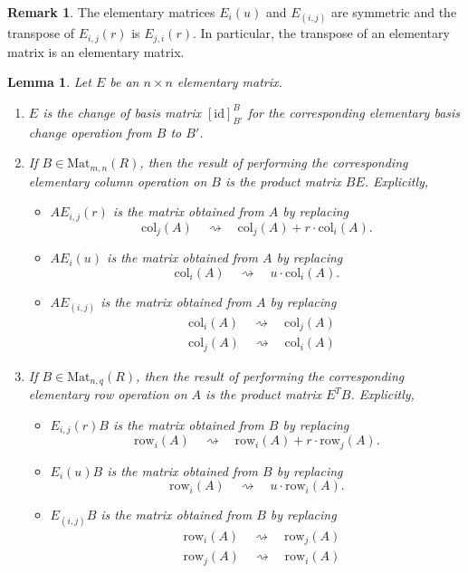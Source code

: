 \documentclass[12pt]{report}
\newtheorem{lemma}[theorem]{Lemma}
\numberwithin{equation}{section}
\numberwithin{theorem}{chapter}
\theoremstyle{definition}
\newtheorem*{basic properties}{Basic Properties}
\newtheorem*{Important Remark}{Important Remark}
\newtheorem{remark}[theorem]{Remark}
\begin{document}
	\begin{remark}
	The elementary matrices $E_i(u)$ and $E_{(i,j)}$ are symmetric and the transpose of $E_{i,j}(r)$ is $E_{j,i}(r)$. In particular, the transpose of an elementary matrix is an elementary matrix.
	\end{remark}


\begin{lemma}
Let $E$ be an $n \times n$ elementary matrix.
\begin{enumerate}
\item $E$ is the change of basis matrix $[\mathrm{id}]_{B'}^B$ for the corresponding elementary basis change operation from $B$ to $B'$.
\item If $B \in \mathrm{Mat}_{m,n}(R)$, then the result of performing the corresponding elementary column operation on $B$ is the product matrix $BE$.
Explicitly,

\begin{itemize}
\item $AE_{i,j}(r)$ is the matrix obtained from $A$ by replacing 
\[ \mathrm{col}_j(A) \quad \rightsquigarrow \quad \mathrm{col}_j(A) + r \cdot \mathrm{col}_i(A).\]
\item $AE_{i}(u)$ is the matrix obtained from $A$ by replacing 
\[ \mathrm{col}_i(A)\quad \rightsquigarrow \quad  u \cdot \mathrm{col}_i(A).\]
\item $A E_{(i,j)}$ is the matrix obtained from $A$ by replacing 
\[ \begin{aligned} &\mathrm{col}_i(A)\quad \rightsquigarrow \quad  \mathrm{col}_j(A)\\
 &\mathrm{col}_j(A)\quad \rightsquigarrow \quad  \mathrm{col}_i(A) \end{aligned}\]
\end{itemize}

\item  If $B \in \mathrm{Mat}_{n,q}(R)$, then the result of performing the corresponding elementary row operation on $A$ is the product matrix $E^T B$. 
Explicitly,

\begin{itemize}
\item $E_{i,j}(r) B$ is the matrix obtained from $B$ by replacing  \[ \mathrm{row}_i(A) \quad \rightsquigarrow \quad \mathrm{row}_i(A) + r \cdot \mathrm{row}_j(A).\]

\item $E_{i}(u) B$ is the matrix obtained from $B$ by replacing \[ \mathrm{row}_i(A)\quad \rightsquigarrow \quad  u \cdot \mathrm{row}_i(A).\]
\item $E_{(i,j)} B$ is the matrix obtained from $B$ by replacing \[ \begin{aligned} &\mathrm{row}_i(A)\quad \rightsquigarrow \quad  \mathrm{row}_j(A)\\
 &\mathrm{row}_j(A)\quad \rightsquigarrow \quad  \mathrm{row}_i(A) \end{aligned}\]
\end{itemize}
\end{enumerate}
\end{lemma}
\end{document}
